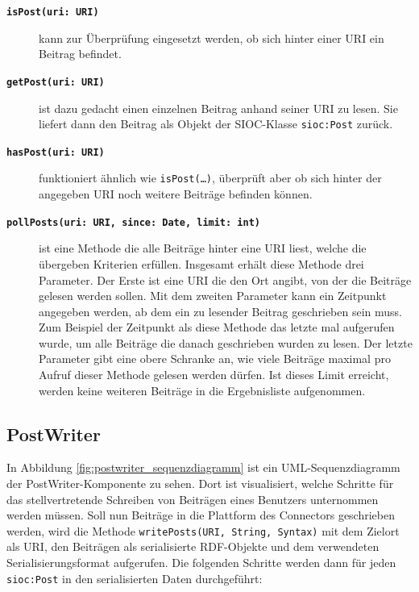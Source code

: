 \begin{description}
    \item[\textbf{\texttt{isPost(uri: URI)}}] kann zur Überprüfung eingesetzt werden, ob sich hinter einer URI ein Beitrag befindet.

    \item[\textbf{\texttt{getPost(uri: URI)}}] ist dazu gedacht einen einzelnen Beitrag anhand seiner URI zu lesen. Sie liefert dann den Beitrag als Objekt der SIOC-Klasse \texttt{sioc:Post} zurück.

    \item[\textbf{\texttt{hasPost(uri: URI)}}] funktioniert ähnlich wie \texttt{isPost(\dots)}, überprüft aber ob sich hinter der angegeben URI noch weitere Beiträge befinden können. 

    \item[\textbf{\texttt{pollPosts(uri: URI, since: Date, limit: int)}}] ist eine Methode die alle Beiträge hinter eine URI liest, welche die übergeben Kriterien erfüllen. Insgesamt erhält diese Methode drei Parameter. Der Erste ist eine URI die den Ort angibt, von der die Beiträge gelesen werden sollen. Mit dem zweiten Parameter kann ein Zeitpunkt angegeben werden, ab dem ein zu lesender Beitrag geschrieben sein muss. Zum Beispiel der Zeitpunkt als diese Methode das letzte mal aufgerufen wurde, um alle Beiträge die danach geschrieben wurden zu lesen. Der letzte Parameter gibt eine obere Schranke an, wie viele Beiträge maximal pro Aufruf dieser Methode gelesen werden dürfen. Ist dieses Limit erreicht, werden keine weiteren Beiträge in die Ergebnisliste aufgenommen.
\end{description}


\subsection{PostWriter} %
\label{sub:postwriter}

In Abbildung \ref{fig:postwriter_sequenzdiagramm} ist ein UML-Sequenzdiagramm der PostWriter-Komponente zu sehen. Dort ist visualisiert, welche Schritte für das stellvertretende Schreiben von Beiträgen eines Benutzers unternommen werden müssen. Soll nun Beiträge in die Plattform des Connectors geschrieben werden, wird die Methode \texttt{writePosts(URI, String, Syntax)} mit dem Zielort als URI, den Beiträgen als serialisierte RDF-Objekte und dem verwendeten Serialisierungsformat aufgerufen. Die folgenden Schritte werden dann für jeden \texttt{sioc:Post} in den serialisierten Daten durchgeführt:

